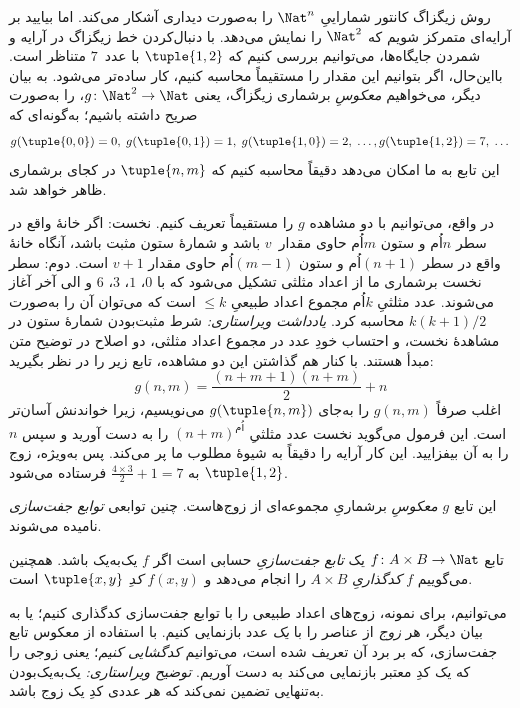 \documentclass[../../../include/open-logic-section]{subfiles}
\begin{document}

\begin{explain}
روش زیگزاگ کانتور شماراییِ $\Nat^n$ را به‌صورت دیداری آشکار می‌کند. اما
بیایید بر آرایه‌ای متمرکز شویم که $\Nat^2$ را نمایش می‌دهد. با دنبال‌کردن
خط زیگزاگ در آرایه و شمردن جایگاه‌ها، می‌توانیم بررسی کنیم که
$\tuple{1,2}$ با عدد~$7$ متناظر است. بااین‌حال، اگر بتوانیم
این مقدار را مستقیماً محاسبه کنیم، کار ساده‌تر می‌شود. به بیان دیگر، می‌خواهیم
\emph{معکوسِ} برشماری زیگزاگ، یعنی $g\colon \Nat^2 \to \Nat$، را به‌صورت صریح
داشته باشیم؛ به‌گونه‌ای که
\[
g(\tuple{0,0}) = 0, \;
g(\tuple{0,1}) = 1, \;
g(\tuple{1,0}) = 2, \; \dots,
g(\tuple{1,2}) = 7, \; \dots
\]
این تابع به ما امکان می‌دهد دقیقاً محاسبه کنیم که $\tuple{n, m}$ در کجای
برشماری ظاهر خواهد شد.

در واقع، می‌توانیم با دو مشاهده $g$ را مستقیماً تعریف کنیم. نخست: اگر
خانهٔ واقع در سطر $n$اُم و ستون $m$اُم حاوی مقدار~$v$ باشد و شمارهٔ ستون مثبت باشد،
آنگاه خانهٔ واقع در سطر $(n+1)$اُم و ستون $(m-1)$اُم حاوی مقدار $v + 1$ است. دوم: سطر نخست
برشماری ما از اعداد مثلثی تشکیل می‌شود که با $0$، $1$، $3$، $6$ و
الی آخر آغاز می‌شوند. عدد مثلثیِ $k$اُم مجموع اعداد طبیعیِ $\leq k$ است
که می‌توان آن را به‌صورت $k(k+1)/2$ محاسبه کرد. \emph{یادداشت ویراستاری:} شرط مثبت‌بودن شمارهٔ ستون در مشاهدهٔ نخست،
و احتساب خودِ عدد در مجموع اعداد مثلثی، دو اصلاح در توضیح متن مبدأ هستند.
با کنار هم گذاشتن این
دو مشاهده، تابع زیر را در نظر بگیرید:
\[
  g(n,m) = \frac{(n+m+1)(n+m)}{2} + n
\]
اغلب صرفاً $g(n, m)$ را به‌جای $g(\tuple{n, m})$ می‌نویسیم، زیرا خواندنش
آسان‌تر است. این فرمول می‌گوید نخست عدد مثلثیِ $(n+m)^\text{اُم}$ را
به دست آورید و سپس $n$ را به آن بیفزایید. این کار آرایه را دقیقاً به
شیوهٔ مطلوب ما پر می‌کند. پس به‌ویژه، زوج $\tuple{1, 2}$ به
$\frac{4 \times 3}{2} +
1 = 7$ فرستاده می‌شود.

این تابع $g$ \emph{معکوسِ} برشماریِ مجموعه‌ای از زوج‌هاست. چنین توابعی
\emph{توابع جفت‌سازی} نامیده می‌شوند.
\end{explain}

\begin{defn}
  تابع $f\colon A \times B \to \Nat$ یک \emph{تابع جفت‌سازیِ} حسابی است
  اگر $f$ یک‌به‌یک باشد. همچنین می‌گوییم $f$ \emph{کدگذاریِ}
  $A \times B$ را انجام می‌دهد و $f(x,y)$ \emph{کدِ} $\tuple{x,y}$ است.
\end{defn}

\begin{explain}
می‌توانیم، برای نمونه، زوج‌های اعداد طبیعی را با توابع جفت‌سازی
کدگذاری کنیم؛ یا به بیان دیگر، هر \emph{زوج} از عناصر را با
\emph{یک} عدد بازنمایی کنیم. با استفاده از معکوس تابع جفت‌سازی، که بر برد آن تعریف شده است، می‌توانیم
\emph{کدگشایی کنیم}؛ یعنی زوجی را که یک کدِ معتبر بازنمایی می‌کند به دست آوریم.
\emph{توضیح ویراستاری:} یک‌به‌یک‌بودن به‌تنهایی تضمین نمی‌کند که هر عددی کدِ یک زوج باشد.
\end{explain}
\end{document}
